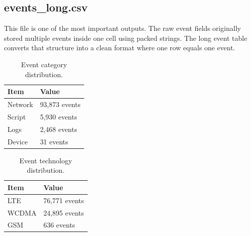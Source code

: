 \documentclass[12pt,a4paper]{article}
\begin{document}
\subsection{events\_long.csv}
This file is one of the most important outputs. The raw event fields originally stored multiple events inside one cell using packed strings. The long event table converts that structure into a clean format where one row equals one event.


\begin{table}[H]
\centering
\begin{tabularx}{0.94\textwidth}{P{5.2cm}Y}
\toprule
\textbf{Item} & \textbf{Value} \\
\midrule
Network & 93,873 events \\
Script & 5,930 events \\
Logs & 2,468 events \\
Device & 31 events \\
\bottomrule
\end{tabularx}
\caption{Event category distribution.}
\end{table}


\begin{table}[H]
\centering
\begin{tabularx}{0.94\textwidth}{P{5.2cm}Y}
\toprule
\textbf{Item} & \textbf{Value} \\
\midrule
LTE & 76,771 events \\
WCDMA & 24,895 events \\
GSM & 636 events \\
\bottomrule
\end{tabularx}
\caption{Event technology distribution.}
\end{table}
\end{document}
